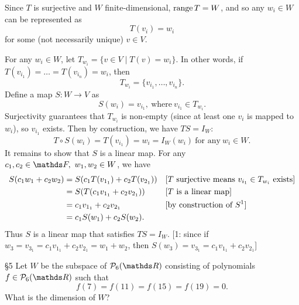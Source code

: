 \documentclass{homework}
\begin{document}
\begin{solution}
  Since $T$ is surjective and $W$ finite-dimensional, $\operatorname{range}{T}=W$, and so any $w_i\in W$ can be
  represented as \[
    T(v_i)=w_i
  \] for some (not necessarily unique) $v\in V$.

  For any $w_i\in W$, let $T_{w_i}=\{v\in V\mid T(v)=w_i\} $. In other words, if
  $T(v_{i_1})=\ldots=T(v_{i_n})=w_i$, then \[
    T_{w_i}=\{ v_{i_1},\ldots,v_{i_n} \}
  .\] Define a map $S:W\to V$ as \[
    S(w_i)=v_{i_1}, ~\text{where}~ v_{i_1}\in T_{w_i}
  .\] Surjectivity guarantees that $T_{w_i}$ is non-empty (since at least one $v_i$ is mapped to
  $w_i$), so $v_{i_1}$ exists. Then by construction, we have $TS=I_W$: \[
    T\circ S(w_i)=T(v_{i_1})=w_i=I_W(w_i) ~\text{for any}~ w_i\in W
  .\] It remains to show that $S$ is a linear map. For any $c_1,c_2\in \F,\ w_1,w_2\in W$, we have
  \begin{align*}
    S(c_1w_1+c_2w_2)&= S(c_1T(v_{1_1})+c_2T(v_{2_1})) && [T ~\text{surjective means}~ v_{i_1}\in
    T_{w_i} ~\text{exists}]\\
                    &= S(T(c_1v_{1_1}+c_2v_{2_1})) && [T ~\text{is a linear map}]\\
                    &=c_1v_{1_1}+c_2v_{2_1} && [\text{by construction of $S$\footnotemark}]\\
                    &=c_1S(w_1)+c_2S(w_2)
  .\end{align*}
  Thus $S$ is a linear map that satisfies $TS=I_W$. [1: since if $w_3=v_{3_1}=c_1v_{1_1}+c_2v_{2_1}=w_1+w_2$, then $S(w_3)=v_{3_1}=c_1v_{1_1}+c_2v_{2_1}$]
\end{solution}

\begin{problem}{\S 5}
  Let $W$ be the subspace of $\mc{P}_6(\R)$ consisting of polynomials $f\in \mc{P}_6(\R)$ such that
  \[
    f(7)=f(11)=f(15)=f(19)=0
  .\] What is the dimension of $W$?
\end{problem}
\end{document}
